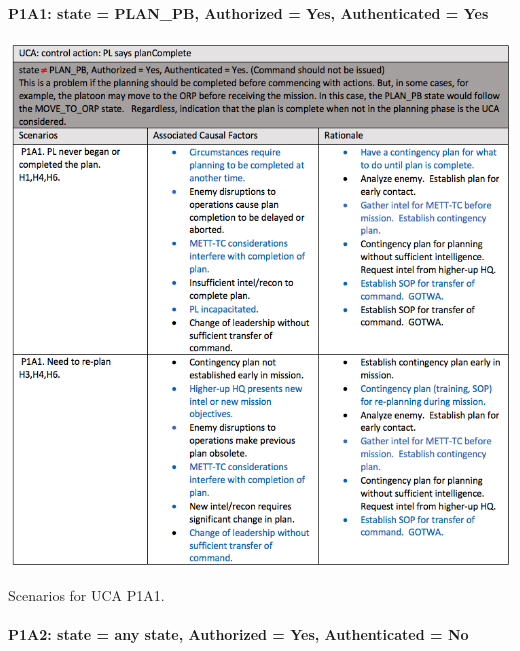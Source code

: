 \documentclass[../../main/main.tex]{subfiles}
\begin{document}
\paragraph*{P1A1: state  = PLAN_PB, Authorized = Yes, Authenticated = Yes}


\begin{table}[ht!]
\begin{center}
\includegraphics[width=\linewidth]{../figures/ucap1a1}
\caption{Scenarios for UCA P1A1.}
\label{ucap1a1}
\end{center}
\end{table}
\clearpage
\paragraph*{P1A2: state  = any state, Authorized = Yes, Authenticated = No}
\end{document}
